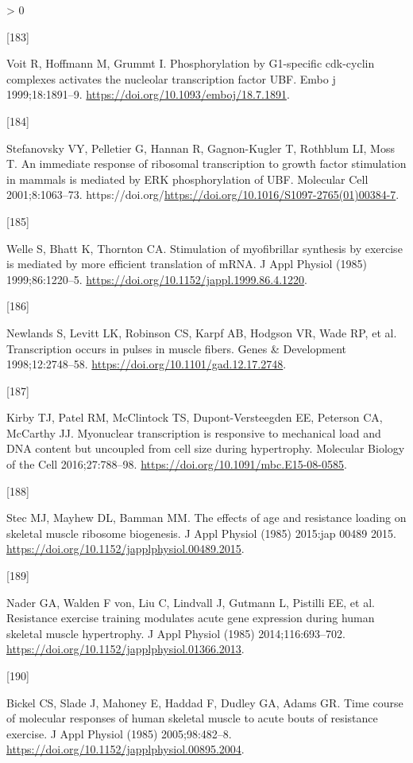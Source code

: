 \documentclass[twoside,10pt]{gihclass} %
\newlength{\cslhangindent}
\newlength{\csllabelwidth}
\newenvironment{CSLReferences}[3] %
 {%
  \setlength{\parindent}{0pt}
  \ifodd #1 \everypar{\setlength{\hangindent}{\cslhangindent}}\ignorespaces\fi
  \ifnum #2 > 0
  \setlength{\parskip}{#2\baselineskip}
  \fi
 }%
 {}
\newcommand{\CSLLeftMargin}[1]{\parbox[t]{\maxof{\widthof{#1}}{\csllabelwidth}}{#1}}
\newcommand{\CSLRightInline}[1]{\parbox[t]{\linewidth}{#1}}
\begin{document}
\begin{CSLReferences}{0}{0}
\leavevmode\hypertarget{ref-RN2602}{}%
\CSLLeftMargin{{[}183{]} }
\CSLRightInline{Voit R, Hoffmann M, Grummt I. Phosphorylation by G1-specific cdk-cyclin complexes activates the nucleolar transcription factor UBF. Embo j 1999;18:1891--9. \url{https://doi.org/10.1093/emboj/18.7.1891}.}

\leavevmode\hypertarget{ref-RN2604}{}%
\CSLLeftMargin{{[}184{]} }
\CSLRightInline{Stefanovsky VY, Pelletier G, Hannan R, Gagnon-Kugler T, Rothblum LI, Moss T. An immediate response of ribosomal transcription to growth factor stimulation in mammals is mediated by ERK phosphorylation of UBF. Molecular Cell 2001;8:1063--73. https://doi.org/\url{https://doi.org/10.1016/S1097-2765(01)00384-7}.}

\leavevmode\hypertarget{ref-RN2155}{}%
\CSLLeftMargin{{[}185{]} }
\CSLRightInline{Welle S, Bhatt K, Thornton CA. Stimulation of myofibrillar synthesis by exercise is mediated by more efficient translation of mRNA. J Appl Physiol (1985) 1999;86:1220--5. \url{https://doi.org/10.1152/jappl.1999.86.4.1220}.}

\leavevmode\hypertarget{ref-RN2618}{}%
\CSLLeftMargin{{[}186{]} }
\CSLRightInline{Newlands S, Levitt LK, Robinson CS, Karpf AB, Hodgson VR, Wade RP, et al. Transcription occurs in pulses in muscle fibers. Genes \& Development 1998;12:2748--58. \url{https://doi.org/10.1101/gad.12.17.2748}.}

\leavevmode\hypertarget{ref-RN2616}{}%
\CSLLeftMargin{{[}187{]} }
\CSLRightInline{Kirby TJ, Patel RM, McClintock TS, Dupont-Versteegden EE, Peterson CA, McCarthy JJ. Myonuclear transcription is responsive to mechanical load and DNA content but uncoupled from cell size during hypertrophy. Molecular Biology of the Cell 2016;27:788--98. \url{https://doi.org/10.1091/mbc.E15-08-0585}.}

\leavevmode\hypertarget{ref-RN1656}{}%
\CSLLeftMargin{{[}188{]} }
\CSLRightInline{Stec MJ, Mayhew DL, Bamman MM. The effects of age and resistance loading on skeletal muscle ribosome biogenesis. J Appl Physiol (1985) 2015:jap 00489 2015. \url{https://doi.org/10.1152/japplphysiol.00489.2015}.}

\leavevmode\hypertarget{ref-RN1037}{}%
\CSLLeftMargin{{[}189{]} }
\CSLRightInline{Nader GA, Walden F von, Liu C, Lindvall J, Gutmann L, Pistilli EE, et al. Resistance exercise training modulates acute gene expression during human skeletal muscle hypertrophy. J Appl Physiol (1985) 2014;116:693--702. \url{https://doi.org/10.1152/japplphysiol.01366.2013}.}

\leavevmode\hypertarget{ref-RN1520}{}%
\CSLLeftMargin{{[}190{]} }
\CSLRightInline{Bickel CS, Slade J, Mahoney E, Haddad F, Dudley GA, Adams GR. Time course of molecular responses of human skeletal muscle to acute bouts of resistance exercise. J Appl Physiol (1985) 2005;98:482--8. \url{https://doi.org/10.1152/japplphysiol.00895.2004}.}


\end{CSLReferences}
\end{document}
